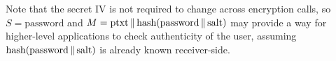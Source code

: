 Note that the secret IV is not required to change across encryption calls, so $S=\mbox{password}$ and $M=\mbox{ptxt}\,\|\, \mbox{hash}(\mbox{password}\,\|\,\mbox{salt})$ may provide a way for higher-level applications to check authenticity of the user, assuming $\mbox{hash}(\mbox{password}\,\|\,\mbox{salt})$ is already known receiver-side.

